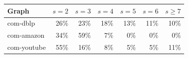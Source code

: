 \begin{tabular}{@{}lrrrrrr@{}}
\toprule
Graph & $s=2$ & $s=3$ & $s=4$ & $s=5$ & $s=6$ & $s\ge7$ \\
\midrule
com-dblp & 26\% & 23\% & 18\% & 13\% & 11\% & 10\% \\
com-amazon & 34\% & 59\% & 7\% & 0\% & 0\% & 0\% \\
com-youtube & 55\% & 16\% & 8\% & 5\% & 5\% & 11\% \\
\bottomrule
\end{tabular}
